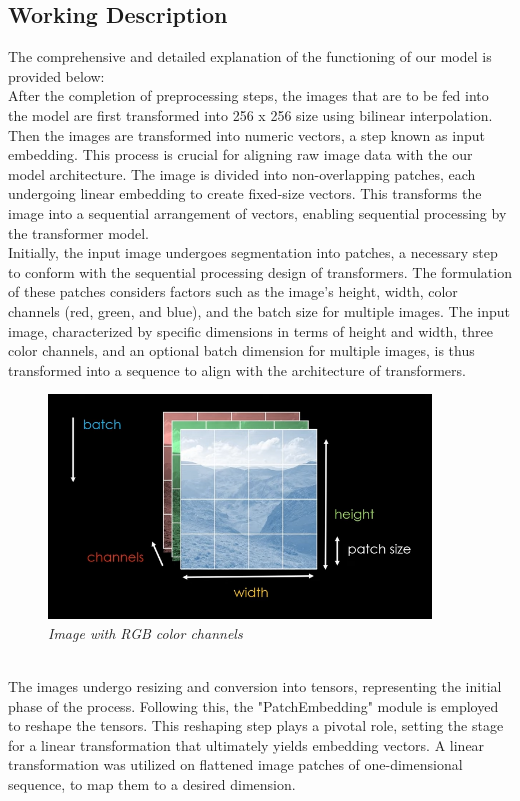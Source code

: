 \subsection{Working Description}

The comprehensive and detailed explanation of the functioning of our model is provided below:\\


After the completion of preprocessing steps, the images that are to be fed into the model are first transformed into  256 x 256 size using bilinear interpolation. Then the images are transformed into numeric vectors, a step known as input embedding. This process is crucial for aligning raw image data with the our model architecture. The image is divided into non-overlapping patches, each undergoing linear embedding to create fixed-size vectors. This transforms the image into a sequential arrangement of vectors, enabling sequential processing by the transformer model.\\

Initially, the input image undergoes segmentation into patches, a necessary step to conform with the sequential processing design of transformers. The formulation of these patches considers factors such as the image's height, width, color channels (red, green, and blue), and the batch size for multiple images. The input image, characterized by specific dimensions in terms of height and width, three color channels, and an optional batch dimension for multiple images, is thus transformed into a sequence to align with the architecture of transformers.\\
\begin{figure}[htbp]
    \centering
    \includegraphics[width=4in]{img/colorbatch.png}
    \caption{\textit{Image with RGB color channels}}
\end{figure}\\
The images undergo resizing and conversion into tensors, representing the initial phase of the process. Following this, the "PatchEmbedding" module is employed to reshape the tensors. This reshaping step plays a pivotal role, setting the stage for a linear transformation that ultimately yields embedding vectors. A linear transformation was utilized on flattened image patches of one-dimensional sequence, to map them to a desired dimension.\\

